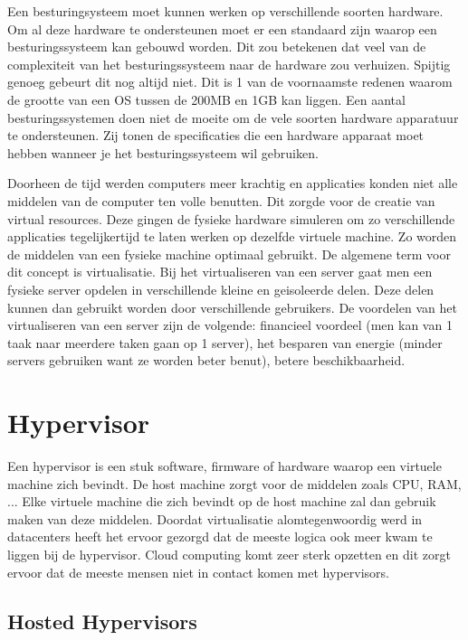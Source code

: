 \documentclass[pdftex,a4paper,12pt,twoside]{report}
\begin{document}
Een besturingsysteem moet kunnen werken op verschillende soorten hardware. Om al deze hardware te ondersteunen moet er een standaard zijn waarop een besturingssysteem kan gebouwd worden. Dit zou betekenen dat veel van de complexiteit van het besturingssysteem naar de hardware zou verhuizen. Spijtig genoeg gebeurt dit nog altijd niet. Dit is 1 van de voornaamste redenen waarom de grootte van een OS tussen de 200MB en 1GB kan liggen. Een aantal besturingssystemen doen niet de moeite om de vele soorten hardware apparatuur te ondersteunen. Zij tonen de specificaties die een hardware apparaat moet hebben wanneer je het besturingssysteem wil gebruiken. \newpage

Doorheen de tijd werden computers meer krachtig en applicaties konden niet alle middelen van de computer ten volle benutten. Dit zorgde voor de creatie van virtual resources. Deze gingen de fysieke hardware simuleren om zo verschillende applicaties tegelijkertijd te laten werken op dezelfde virtuele machine. Zo worden de middelen van een fysieke machine optimaal gebruikt. De algemene term voor dit concept is virtualisatie. Bij het virtualiseren van een server gaat men een fysieke server opdelen in verschillende kleine en geisoleerde delen. Deze delen kunnen dan gebruikt worden door verschillende gebruikers. De voordelen van het virtualiseren van een server zijn de volgende: financieel voordeel (men kan van 1 taak naar meerdere taken gaan op 1 server), het besparen van energie (minder servers gebruiken want ze worden beter benut), betere beschikbaarheid.

\section{Hypervisor}

Een hypervisor is een stuk software, firmware of hardware waarop een virtuele machine zich bevindt. De host machine zorgt voor de middelen zoals CPU, RAM, ... Elke virtuele machine die zich bevindt op de host machine zal dan gebruik maken van deze middelen. Doordat virtualisatie alomtegenwoordig werd in datacenters heeft het ervoor gezorgd dat de meeste logica ook meer kwam te liggen bij de hypervisor. Cloud computing komt zeer sterk opzetten en dit zorgt ervoor dat de meeste mensen niet in contact komen met hypervisors.

\subsection{Hosted Hypervisors}
\end{document}
